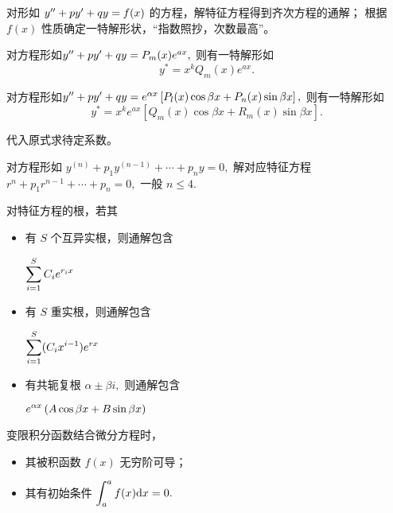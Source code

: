 
对形如 $ y^{\prime\prime} + py' + qy = f(x) $ 的方程，解特征方程得到齐次方程的通解；
根据 $ f(x) $ 性质确定一特解形状，“指数照抄，次数最高”。

对方程形如$
    y^{\prime\prime} + py'+qy = P_m(x)e^{ax},
$ 
则有一特解形如$$
    y^* = x^k Q_m(x) e^{ax}.
$$ 

对方程形如$
    y^{\prime\prime} + py'+qy = e^{\alpha x}\left[P_l(x)\cos \beta x+P_n(x)\sin \beta x\right],
$ 
则有一特解形如$$
    y^* = x^ke^{ax}\left[Q_m(x)\cos\beta x+R_m(x)\sin \beta x\right].
$$ 

代入原式求待定系数。


对方程形如 $ y^{(n)} +p_1y^{(n-1)} + \cdots + p_n y = 0, $ 
解对应特征方程 $ r^n + p_1r^{n-1}+ \cdots + p_n = 0, $ 一般 $ n \leq 4. $ 

对特征方程的根，若其
\begin{itemize}
    \item 有 $ S $ 个互异实根，则通解包含
    
    $ \displaystyle \sum_{i = 1}^S C_ie^{r_ix} $ 
    \item 有 $ S $ 重实根，则通解包含
    
    $ \displaystyle \sum_{i=1}^S (C_i x^{i-1})e^{rx} $ 
    \item 有共轭复根 $ \alpha \pm \beta i, $ 则通解包含
    
    $ \displaystyle e^{\alpha x}\left(A\cos \beta x + B\sin \beta x\right) $ 
\end{itemize}

变限积分函数结合微分方程时，
\begin{itemize}
    \item 其被积函数 $ f(x) $ 无穷阶可导；
    \item 其有初始条件 $ \displaystyle \int_a^a f(x)\mathrm{d}x = 0. $ 
\end{itemize}